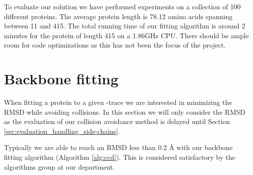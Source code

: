 To evaluate our solution we have performed experiments on a collection of 100 different proteins.
The average protein length is 78.12 amino acids spanning between 11 and 415.
The total running time of our fitting algorithm is around 2 minutes for the protein of length 415 on a 1.86GHz CPU.
There should be ample room for code optimizations as this has not been the focus of the project.

\section{Backbone fitting}
When fitting a protein to a given \Ca-trace we are interested in minimizing the RMSD while avoiding collisions.
In this section we will only consider the RMSD as the evaluation of our collision avoidance method  is delayed until Section \ref{sec:evaluation_handling_side-chains}. 

Typically we are able to reach an RMSD less than 0.2 Å with our backbone fitting algorithm (Algorithm \ref{alg:ccd}).
This is considered satisfactory by the algorithms group at our department.
\newpage\vspace*{-15mm}
